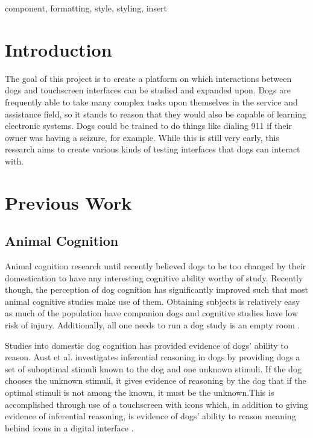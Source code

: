 \documentclass[conference]{IEEEtran}
\begin{document}
    \begin{IEEEkeywords}
        component, formatting, style, styling, insert
    \end{IEEEkeywords}


    \section{Introduction}
    The goal of this project is to create a platform on which interactions between dogs and touchscreen interfaces can be studied and expanded upon. Dogs are frequently able to take many complex tasks upon themselves in the service and assistance field, so it stands to reason that they would also be capable of learning electronic systems. Dogs could be trained to do things like dialing 911 if their owner was having a seizure, for example. While this is still very early, this research aims to create various kinds of testing interfaces that dogs can interact with.


    \section{Previous Work}
    \subsection{Animal Cognition}
        Animal cognition research until recently believed dogs to be too changed by their domestication to have any interesting cognitive ability worthy of study. Recently though, the perception of dog cognition has significantly improved such that most animal cognitive studies make use of them. Obtaining subjects is relatively easy as much of the population have companion dogs and cognitive studies have low risk of injury. Additionally, all one needs to run a dog study is an empty room \cite{Morell2009}.
        
        Studies into domestic dog cognition has provided evidence of dogs’ ability to reason. Aust et al. investigates inferential reasoning in dogs by providing dogs a set of suboptimal stimuli known to the dog and one unknown stimuli. If the dog chooses the unknown stimuli, it gives evidence of reasoning by the dog that if the optimal stimuli is not among the known, it must be the unknown.This is accomplished through use of a touchscreen with icons which, in addition to giving evidence of inferential reasoning, is evidence of dogs’ ability to reason meaning behind icons in a digital interface \cite{Aust2008}.
        
\end{document}
